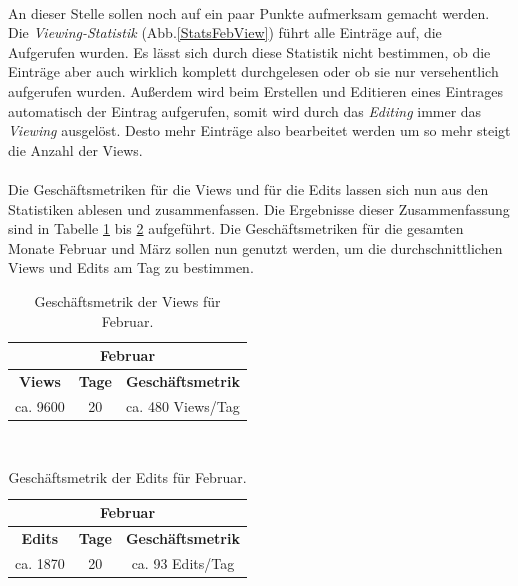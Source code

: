 \documentclass[a4paper,12pt,twoside]{scrartcl}
\begin{document}
\\
An dieser Stelle sollen noch auf ein paar Punkte aufmerksam gemacht werden. Die \textit{Viewing-Statistik} (Abb.\ref{StatsFebView}) führt alle Einträge auf, die Aufgerufen wurden. Es lässt sich durch diese Statistik nicht bestimmen, ob die Einträge aber auch wirklich komplett durchgelesen oder ob sie nur versehentlich aufgerufen wurden. Außerdem wird beim Erstellen und Editieren eines Eintrages automatisch der Eintrag aufgerufen, somit wird durch das \textit{Editing} immer das \textit{Viewing} ausgelöst. Desto mehr Einträge also bearbeitet werden um so mehr steigt die Anzahl der Views. 
\\\\
Die Geschäftsmetriken für die Views und für die Edits lassen sich nun aus den Statistiken ablesen und zusammenfassen. Die Ergebnisse dieser Zusammenfassung sind in Tabelle \ref{ViewKennzahlenFeb} bis \ref{EditKennzahlenFeb} aufgeführt. Die Geschäftsmetriken für die gesamten Monate Februar und März sollen nun genutzt werden, um die durchschnittlichen Views und Edits am Tag zu bestimmen.
\begin{table}[htb]
\begin{center}
\begin{tabular}{|c|c|c|}\hline
\multicolumn{3}{|c|}{\textbf{Februar}} \rule{0pt}{15pt}\\
\hline
\rule{0pt}{15pt} \textbf{Views} & \textbf{Tage} & \textbf{Geschäftsmetrik} \\ 
\hline
\rule{0pt}{15pt} ca. 9600 & 20 & ca. 480 Views/Tag \\
\hline
\end{tabular}
\caption{Geschäftsmetrik der Views für Februar.}
\label{ViewKennzahlenFeb}
\end{center}
\end{table}
\\
\begin{table}[htb]
\begin{center}
\begin{tabular}{|c|c|c|}\hline
\multicolumn{3}{|c|}{\textbf{Februar}} \rule{0pt}{15pt}\\
\hline
\rule{0pt}{15pt} \textbf{Edits} & \textbf{Tage} & \textbf{Geschäftsmetrik} \\ 
\hline
\rule{0pt}{15pt} ca. 1870 & 20 & ca. 93 Edits/Tag \\
\hline
\end{tabular}
\caption{Geschäftsmetrik der Edits für Februar.}
\label{EditKennzahlenFeb}
\end{center}
\end{table}
\end{document}
